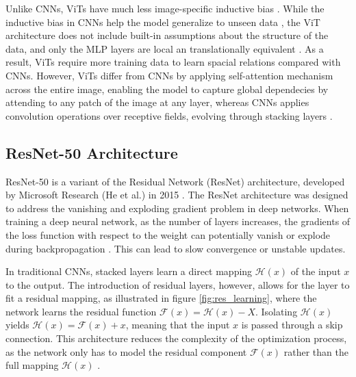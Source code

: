 \noindent Unlike CNNs, ViTs have much less image-specific inductive bias \cite{dosovitskiy2021imageworth16x16words}. While the inductive bias in CNNs help the model generalize to unseen data \cite{kim2020inductivebias}, the ViT architecture does not include built-in assumptions about the structure of the data, and only the MLP layers are local an translationally equivalent \cite{dosovitskiy2021imageworth16x16words}. As a result, ViTs require more training data to learn spacial relations compared with CNNs. However, ViTs differ from CNNs by applying self-attention mechanism across the entire image, enabling the model to capture global dependecies by attending to any patch of the image at any layer, whereas CNNs applies convolution operations over receptive fields, evolving through stacking layers \cite{cs231n}.




\subsection{ResNet-50 Architecture}
\label{sec:resnet}
ResNet-50 is a variant of the Residual Network (ResNet) architecture, developed by Microsoft Research (He et al.) in 2015 \cite{he2015deepresiduallearningimage}. The ResNet architecture was designed to address the vanishing and exploding gradient problem in deep networks. When training a deep neural network, as the number of layers increases, the gradients of the loss function with respect to the weight can potentially vanish or explode during backpropagation \cite{he2015deepresiduallearningimage}. This can lead to slow convergence or unstable updates.

In traditional CNNs, stacked layers learn a direct mapping $\mathcal{H}(x)$ of the input $x$ to the output. The introduction of residual layers, however, allows for the layer to fit a residual mapping, as illustrated in figure \ref{fig:res_learning}, where the network learns the residual function $\mathcal{F}(x) = \mathcal{H}(x) - X$. Isolating $\mathcal{H}(x)$ yields $\mathcal{H}(x) = \mathcal{F}(x) + x$, meaning that the input $x$ is passed through a skip connection. This architecture reduces the complexity of the optimization process, as the network only has to model the residual component $\mathcal{F}(x)$ rather than the full mapping $\mathcal{H}(x)$ \cite{he2015deepresiduallearningimage}.

